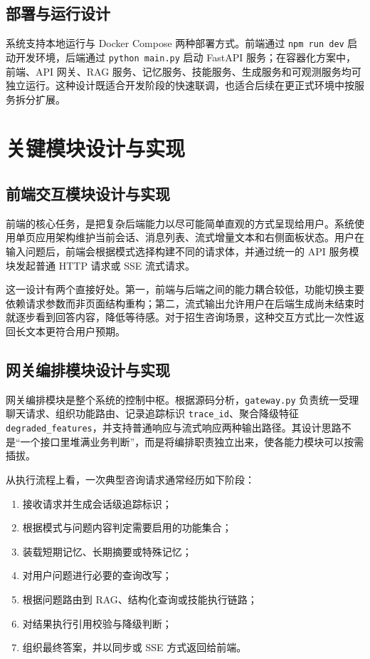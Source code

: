 \documentclass[UTF8,zihao=-4,oneside,fontset=windows]{ctexbook}
\numberwithin{equation}{chapter}
\begin{document}
\section{部署与运行设计}
系统支持本地运行与 Docker Compose 两种部署方式。前端通过 \texttt{npm run dev} 启动开发环境，后端通过 \texttt{python main.py} 启动 FastAPI 服务；在容器化方案中，前端、API 网关、RAG 服务、记忆服务、技能服务、生成服务和可观测服务均可独立运行\cite{projectreadme}。这种设计既适合开发阶段的快速联调，也适合后续在更正式环境中按服务拆分扩展。

\chapter{关键模块设计与实现}

\section{前端交互模块设计与实现}
前端的核心任务，是把复杂后端能力以尽可能简单直观的方式呈现给用户。系统使用单页应用架构维护当前会话、消息列表、流式增量文本和右侧面板状态。用户在输入问题后，前端会根据模式选择构建不同的请求体，并通过统一的 API 服务模块发起普通 HTTP 请求或 SSE 流式请求。

这一设计有两个直接好处。第一，前端与后端之间的能力耦合较低，功能切换主要依赖请求参数而非页面结构重构；第二，流式输出允许用户在后端生成尚未结束时就逐步看到回答内容，降低等待感。对于招生咨询场景，这种交互方式比一次性返回长文本更符合用户预期。

\section{网关编排模块设计与实现}
网关编排模块是整个系统的控制中枢。根据源码分析，\texttt{gateway.py} 负责统一受理聊天请求、组织功能路由、记录追踪标识 \texttt{trace\_id}、聚合降级特征 \texttt{degraded\_features}，并支持普通响应与流式响应两种输出路径\cite{projectanalysis}。其设计思路不是“一个接口里堆满业务判断”，而是将编排职责独立出来，使各能力模块可以按需插拔。

从执行流程上看，一次典型咨询请求通常经历如下阶段：

\begin{enumerate}
  \item 接收请求并生成会话级追踪标识；
  \item 根据模式与问题内容判定需要启用的功能集合；
  \item 装载短期记忆、长期摘要或特殊记忆；
  \item 对用户问题进行必要的查询改写；
  \item 根据问题路由到 RAG、结构化查询或技能执行链路；
  \item 对结果执行引用校验与降级判断；
  \item 组织最终答案，并以同步或 SSE 方式返回给前端。
\end{enumerate}
\end{document}
